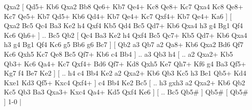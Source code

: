 Qxa2 [  Qd5+ Kb6  Qxa2 Bb8  Qe6+ Kb7  Qe4+ Kc8  Qe8+ Kc7  Qxa4 Kc8  Qe8+ Kc7  Qe5+ Kb7  Qd5+ Kb6  Qd4+ Kb7  Qe4+ Kc7  Qxf4+ Kb7  Qe4+ Ka6   ]  [  Qxa2 Bc5  Qc4 Ba3  Ke2 h4  Qxf4 Kb5  Qd4 Bc5  Qd7+ Kb6  Qxa4 h3  g4 Bg1  Qf4 Kc6  Qh6+   ] .. Bc5    Qb2 [  Qc4 Ba3  Ke2 h4  Qxf4 Bc5  Qc7+ Kb5  Qd7+ Kb6  Qxa4 h3  g4 Bg1  Qf4 Kc6  g5 Bb6  g6 Bc7   ]  [  Qb2 a3  Qb7 a2  Qa8+ Kb6  Qxa2 Bd6  Qf7 Kc6  Qxh5 Kc7  Qe8 Bc5  Qf7+ Kb6  c4 Bb4   ] .. a3    Qb3   h4 [ .. a2  Qxa2+ Kb5  Qb3+ Kc6  Qa4+ Kc7  Qxf4+ Bd6  Qf7+ Kd8  Qxh5 Ke7  Qh7+ Kf6  g4 Ba3  Qf5+ Kg7  f4 Be7  Ke2   ]  [ .. h4  c4 Bb4  Ke2 a2  Qxa2+ Kb6  Qb3 Kc5  h3 Be1  Qb5+ Kd4  Kxe1 Kd3  Qf5+ Kxc4  Qxf4+   ]  c4   Bb4    Ke2   Bc5 [ .. h3  gxh3 a2  Qxa2+ Kb6  Qb2 Kc5  Qb3 Ba3  Qxa3+ Kxc4  Qa4+ Kd5  Qxf4 Ke6   ]  [ .. Bc5  Qb5#   ]  Qb5#    [  Qb5#   ] 1-0  |
